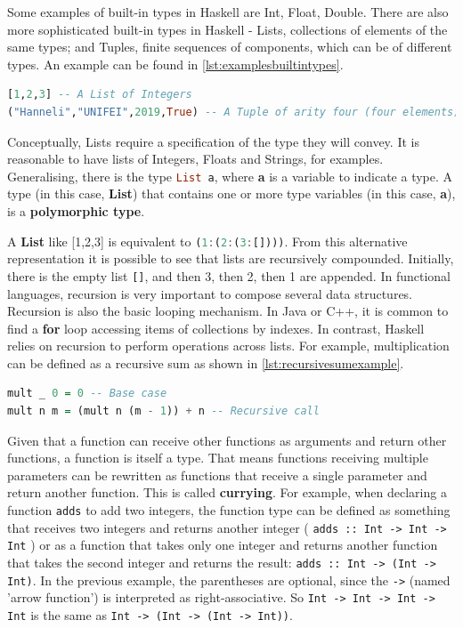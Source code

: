 Some examples of built-in types in Haskell are Int, Float, Double. There are also more sophisticated built-in types in Haskell - Lists, collections of elements of the same types; and Tuples, finite sequences of components, which can be of different types. An example can be found in \cref{lst:examplesbuiltintypes}.

\begin{lstlisting}[language=Haskell, label={lst:examplesbuiltintypes}, caption={Lists and Tuples}, captionpos=b]
[1,2,3] -- A List of Integers
("Hanneli","UNIFEI",2019,True) -- A Tuple of arity four (four elements)
\end{lstlisting}

Conceptually, Lists require a specification of the type they will convey. It is reasonable to have lists of Integers, Floats and Strings, for examples. Generalising, there is the type \lstinline[language=haskell]{List a}, where \textbf{a} is a variable to indicate a type. A type (in this case, \textbf{List}) that contains one or more type variables (in this case, \textbf{a}), is a \textbf{polymorphic type}.


A \textbf{List} like [1,2,3] is equivalent to \lstinline[language=haskell]{(1:(2:(3:[])))}. From this alternative representation it is possible to see that lists are recursively compounded. Initially, there is the empty list \lstinline[language=haskell]{[]}, and then 3, then 2, then 1 are appended. In functional languages, recursion is very important to compose several data structures. Recursion is also the basic looping mechanism. In Java or C++, it is common to find a \textbf{for} loop accessing items of collections by indexes. In contrast, Haskell relies on recursion to perform operations across lists. For example, multiplication can be defined as a recursive sum as shown in \cref{lst:recursivesumexample}.


\begin{lstlisting}[language=Haskell, label={lst:recursivesumexample}, caption={Recursion}, captionpos=b]
mult _ 0 = 0 -- Base case
mult n m = (mult n (m - 1)) + n -- Recursive call
\end{lstlisting}


Given that a function can receive other functions as arguments and return other functions, a function is itself a type. That means functions receiving multiple parameters can be rewritten as functions that receive a single parameter and return another function. This is called \textbf{currying}. For example, when declaring a function \lstinline!adds! to add two integers, the function type can be defined as something that receives two integers and returns another integer ( \lstinline!adds :: Int -> Int -> Int! ) or as a function that takes only one integer and returns another function that takes the second integer and returns the result: \lstinline!adds :: Int -> (Int -> Int)!. In the previous example, the parentheses are optional, since the \lstinline!->! (named 'arrow function') is interpreted as right-associative. So \lstinline!Int -> Int -> Int -> Int! is the same as \lstinline!Int -> (Int -> (Int -> Int))!.

